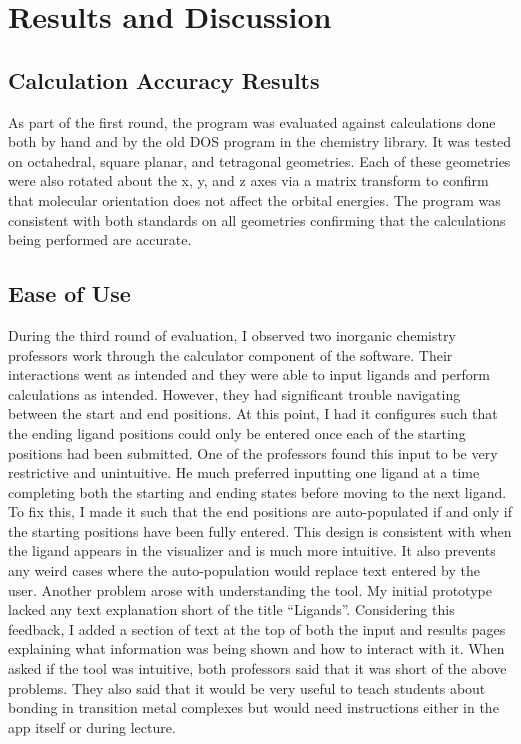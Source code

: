 \documentclass[10pt,twocolumn]{article}
\begin{document}
\section{Results and Discussion}
\subsection{Calculation Accuracy Results}
As part of the first round, the program was evaluated against calculations done both by hand and by the old DOS program in the chemistry library. It was tested on octahedral, square planar, and tetragonal geometries. Each of these geometries were also rotated about the x, y, and z axes via a matrix transform to confirm that molecular orientation does not affect the orbital energies. The program was consistent with both standards on all geometries confirming that the calculations being performed are accurate.

\subsection{Ease of Use}
During the third round of evaluation, I observed two inorganic chemistry professors work through the calculator component of the software. Their interactions went as intended and they were able to input ligands and perform calculations as intended. However, they had significant trouble navigating between the start and end positions. At this point, I had it configures such that the ending ligand positions could only be entered once each of the starting positions had been submitted. One of the professors found this input to be very restrictive and unintuitive. He much preferred inputting one ligand at a time completing both the starting and ending states before moving to the next ligand. To fix this, I made it such that the end positions are auto-populated if and only if the starting positions have been fully entered. This design is consistent with when the ligand appears in the visualizer and is much more intuitive. It also prevents any weird cases where the auto-population would replace text entered by the user. Another problem arose with understanding the tool. My initial prototype lacked any text explanation short of the title ``Ligands''. Considering this feedback, I added a section of text at the top of both the input and results pages explaining what information was being shown and how to interact with it. When asked if the tool was intuitive, both professors said that it was short of the above problems. They also said that it would be very useful to teach students about bonding in transition metal complexes but would need instructions either in the app itself or during lecture.
\end{document}
